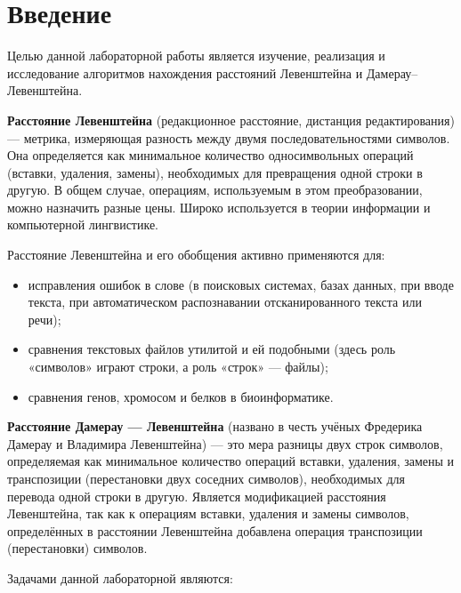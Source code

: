 \chapter*{Введение}

Целью данной лабораторной работы является изучение, реализация и исследование алгоритмов нахождения расстояний Левенштейна и Дамерау--Левенштейна.

\textbf{Расстояние Левенштейна}  (редакционное расстояние, дистанция редактирования) — метрика, измеряющая разность между двумя последовательностями символов. Она определяется как минимальное количество односимвольных операций (вставки, удаления, замены), необходимых для превращения одной строки в другую. В общем случае, операциям, используемым в этом преобразовании, можно назначить разные цены. Широко используется в теории информации и компьютерной лингвистике.


Расстояние Левенштейна и его обобщения активно применяются для:
\begin{itemize}
	\item исправления ошибок в слове (в поисковых системах, базах данных, при вводе текста, при автоматическом распознавании отсканированного текста или речи);
	\item сравнения текстовых файлов утилитой  и ей подобными (здесь роль «символов» играют строки, а роль «строк» — файлы);
	\item сравнения генов, хромосом и белков в биоинформатике.
\end{itemize}

\textbf{Расстояние Дамерау — Левенштейна} (названо в честь учёных Фредерика Дамерау и Владимира Левенштейна) — это мера разницы двух строк символов, определяемая как минимальное количество операций вставки, удаления, замены и транспозиции (перестановки двух соседних символов), необходимых для перевода одной строки в другую. Является модификацией расстояния Левенштейна, так как к операциям вставки, удаления и замены символов, определённых в расстоянии Левенштейна добавлена операция транспозиции (перестановки) символов.

\newpage

Задачами данной лабораторной являются:

